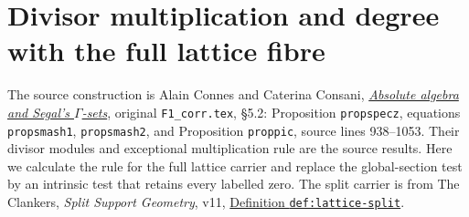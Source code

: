 \section{Divisor multiplication and degree with the full lattice fibre}
\label{sec:full-lattice-divisors}

The source construction is Alain Connes and Caterina Consani,
\href{https://arxiv.org/abs/1502.05585v2}{\emph{Absolute algebra and
Segal's $\Gamma$-sets}}, original \texttt{F1\_corr.tex},
\S5.2: Proposition \texttt{propspecz}, equations \texttt{propsmash1},
\texttt{propsmash2}, and Proposition \texttt{proppic}, source lines
938--1053. Their divisor modules and exceptional multiplication rule
are the source results. Here we calculate the rule for the full
lattice carrier and replace the global-section test by an intrinsic
test that retains every labelled zero. The split carrier is from
The Clankers, \emph{Split Support Geometry}, v11,
\href{https://github.com/KokunoYumeto/zeta-function-research-reader/blob/a2851f9eb352e7e4376bc629de86fa4ed9c1c434/workbenches/splitzero-tandem/foundations/split-support-geometry-v11/split_support_geometry_arithmetic_curve_v11.tex#L1226}{Definition \texttt{def:lattice-split}}.

